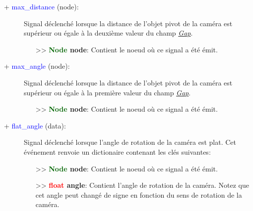 \documentclass[a4paper, 11pt]{article}
\begin{document}
	\newpage \begin{description}
		\item [+ \textcolor{blue}{max\_distance} (node):] Signal déclenché lorsque la distance de l'objet 
		pivot de la caméra est supérieur ou égale à la deuxième valeur du champ \textit{\hyperlink{gap}
		{Gap}}.
		\begin{itemize}
			\item [>> \textbf{\textcolor{darkgreen}{Node} node}:] Contient le noeud où ce signal a été émit.
			\\
		\end{itemize}
	\end{description}
	\begin{description}
		\item [+ \textcolor{blue}{max\_angle} (node):] Signal déclenché lorsque la distance de l'objet 
		pivot de la caméra est \\supérieur ou égale à la première valeur du champ \textit{\hyperlink{gap}
		{Gap}}.
		\begin{itemize}
			\item [>> \textbf{\textcolor{darkgreen}{Node} node}:] Contient le noeud où ce signal a été émit.
			\\
		\end{itemize}
	\end{description}
	\begin{description}
		\item [+ \textcolor{blue}{flat\_angle} (data):] Signal déclenché lorsque l'angle de rotation de la 
		caméra est plat. Cet \\événement renvoie un dictionaire contenant les clés suivantes:
		\begin{itemize}
			\item [>> \textbf{\textcolor{darkgreen}{Node} node}:] Contient le noeud où ce signal a été émit.
			\item [>> \textbf{\textcolor{red}{float} angle}:] Contient l'angle de rotation de la caméra. 
			Notez que cet angle peut changé de signe en fonction du sens de rotation de la caméra.
		\end{itemize}
	\end{description}
\end{document}
